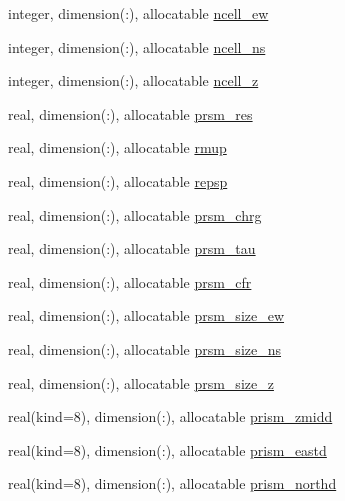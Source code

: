 \begin{DoxyCompactItemize}
integer, dimension(\+:), allocatable \hyperlink{namespacemg__input__routines_ac7e71234c4ec9ad59fd8b0d33c8809af}{ncell\+\_\+ew}
\item 
integer, dimension(\+:), allocatable \hyperlink{namespacemg__input__routines_aec49c121aaee899e4b0f33bf6943bcb4}{ncell\+\_\+ns}
\item 
integer, dimension(\+:), allocatable \hyperlink{namespacemg__input__routines_a0a0ce37b6540f74233bf3aadaa260f96}{ncell\+\_\+z}
\item 
real, dimension(\+:), allocatable \hyperlink{namespacemg__input__routines_a88f6097023f8d53acf45a2cd7f976344}{prsm\+\_\+res}
\item 
real, dimension(\+:), allocatable \hyperlink{namespacemg__input__routines_afbce09624f454be0b02b077f690ad964}{rmup}
\item 
real, dimension(\+:), allocatable \hyperlink{namespacemg__input__routines_adcd8638c001ab38fd059d439f81680e8}{repsp}
\item 
real, dimension(\+:), allocatable \hyperlink{namespacemg__input__routines_ac4b823779f4f1d9c4c865c6c10fa6ac3}{prsm\+\_\+chrg}
\item 
real, dimension(\+:), allocatable \hyperlink{namespacemg__input__routines_a9705d034bcbc95f9aa4c692fa6179e28}{prsm\+\_\+tau}
\item 
real, dimension(\+:), allocatable \hyperlink{namespacemg__input__routines_adea12aabc0029be1c31e4df42901ca59}{prsm\+\_\+cfr}
\item 
real, dimension(\+:), allocatable \hyperlink{namespacemg__input__routines_a6f5b140f82f592045dc986e2dc03f53f}{prsm\+\_\+size\+\_\+ew}
\item 
real, dimension(\+:), allocatable \hyperlink{namespacemg__input__routines_a3e3b754cd4bc045bf19d4e4e03d012db}{prsm\+\_\+size\+\_\+ns}
\item 
real, dimension(\+:), allocatable \hyperlink{namespacemg__input__routines_ade50e1020813ba08c9ed7d460dd19c75}{prsm\+\_\+size\+\_\+z}
\item 
real(kind=8), dimension(\+:), allocatable \hyperlink{namespacemg__input__routines_ae1f2713de2bcca2185162ab5375f6b6e}{prism\+\_\+zmidd}
\item 
real(kind=8), dimension(\+:), allocatable \hyperlink{namespacemg__input__routines_a53fc28fb731802a24bd6d16a5e7e00b6}{prism\+\_\+eastd}
\item 
real(kind=8), dimension(\+:), allocatable \hyperlink{namespacemg__input__routines_a19683e50dac001a949205f52ccd0cb23}{prism\+\_\+northd}
\item 

\end{DoxyCompactItemize}
